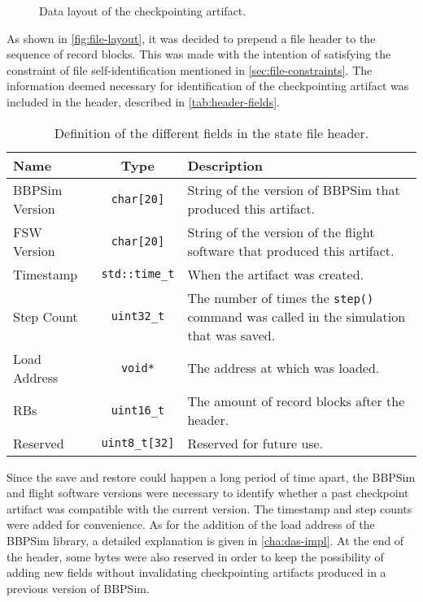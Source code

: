{\begin{figure}[h]
	\vspace{6pt}
	\centering
	\small
	
	\caption{Data layout of the checkpointing artifact.}
	\label{fig:file-layout}
\end{figure}

As shown in \autoref{fig:file-layout}, it was decided to prepend a file header to the sequence of record blocks. This was made with the intention of satisfying the constraint of file self-identification mentioned in \autoref{sec:file-constraints}. The information deemed necessary for identification of the checkpointing artifact was included in the header, described in \autoref{tab:header-fields}.
\begin{table}[h]
	\vspace{12pt}
	\centering
	\begin{tabularx}{\linewidth}{l c X}
		\toprule
		{\bfseries Name}&{\bfseries \Cpp Type}&{\bfseries Description}\\
		\midrule
		BBPSim Version & \texttt{char[20]} & String of the version of BBPSim that produced this artifact.\\
		\midrule
		FSW Version & \texttt{char[20]} & String of the version of the flight software that produced this artifact.\\
		\midrule
		Timestamp & \texttt{std::time_t} & When the artifact was created.\\
		\midrule
		Step Count & \texttt{uint32_t} & The number of times the \texttt{step()} command was called in the simulation that was saved.\\
		\midrule
		Load Address & \texttt{void*} & The address at which \pathmono{libBbpSim.so} was loaded.\\
		\midrule
		RBs & \texttt{uint16_t} & The amount of record blocks after the header.\\
		\midrule
		Reserved & \texttt{uint8_t[32]} & Reserved for future use.\\
		\bottomrule	
	\end{tabularx}
	\caption{Definition of the different fields in the state file header.}
	\label{tab:header-fields}
\end{table}

Since the save and restore could happen a long period of time apart, the BBPSim and flight software versions were necessary to identify whether a past checkpoint artifact was compatible with the current version. The timestamp and step counts were added for convenience. As for the addition of the load address of the BBPSim library, a detailed explanation is given in \autoref{cha:das-impl}. At the end of the header, some bytes were also reserved in order to keep the possibility of adding new fields without invalidating checkpointing artifacts produced in a previous version of BBPSim.
}